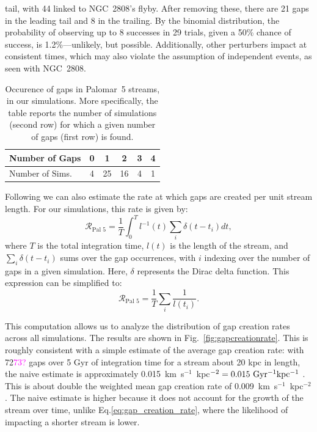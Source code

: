 \documentclass[draft]{aa}
\newcommand{\paola}[1]{\textcolor{magenta}{{#1}}}
\begin{document}
tail, with 44 linked to NGC~2808's flyby. After removing these, there are 21 gaps in the leading tail and 8 in the trailing. By the binomial distribution, the probability of observing up to 8 successes in 29 trials, given a 50\% chance of success, is 1.2\%—unlikely, but possible. Additionally, other perturbers impact at consistent times, which may also violate the assumption of independent events, as seen with NGC~2808.

    \begin{table}[h]
      \centering
        \begin{tabular}{|l|c|c|c|c|c|}
          \hline
          Number of Gaps & 0 & 1 & 2 & 3 & 4 \\
          \hline
          Number of Sims. & 4 & 25 & 16 & 4 & 1 \\
          \hline
        \end{tabular}
        \vspace{0.5cm}
      \caption{Occurence of gaps in Palomar~5 streams,  in our simulations. More specifically, the table reports the number of simulations (second row) for which a given number of gaps (first row) is found. }\label{table:gap_distribution}
    \end{table}

    Following  \citet{2012ApJ...748...20C} we can also estimate the rate at which gaps are created per unit stream length. For our simulations, this rate is given by: \begin{equation} \label{eq:gap_creation_rate} \mathcal{R}_{\textrm{Pal 5}} =  \frac{1}{T}\int_{0}^T l^{-1}(t) \sum_i \delta(t-t_i) dt,\end{equation}where $T$ is the total integration time, $l(t)$ is the length of the stream, and $\sum_i \delta(t-t_i)$ sums over the gap occurrences, with $i$ indexing over the number of gaps in a given simulation. Here, $\delta$ represents the Dirac delta function. This expression can be simplified to:\begin{equation}\mathcal{R}_{\textrm{Pal 5}} =  \frac{1}{T} \sum_i \frac{1}{l (t_i)}. \end{equation}
    
    This computation allows us to analyze the distribution of gap creation rates across all simulations. The results are shown in Fig.~\ref{fig:gapcreationrate}. This is roughly consistent with a simple estimate of the average gap creation rate: with 72\paola{73?} gaps over 5 Gyr of integration time for a stream about 20 kpc in length, the naive estimate is approximately 0.015~km~s$^{-1}$~kpc$^{-2} = 0.015~\rm{Gyr^{-1}kpc^{-1}}$ . This is about double the weighted mean gap creation rate of 0.009~km~s$^{-1}$~kpc$^{-2}$. The naive estimate is higher because it does not account for the growth of the stream over time, unlike Eq.\ref{eq:gap_creation_rate}, where the likelihood of impacting a shorter stream is lower.
\end{document}
